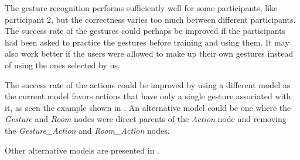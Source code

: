 The gesture recognition performs sufficiently well for some participants, like participant 2, but the correctness varies too much between different participants.
The success rate of the gestures could perhaps be improved if the participants had been asked to practice the gestures before training and using them.
It may also work better if the users were allowed to make up their own gestures instead of using the ones selected by us.

The success rate of the actions could be improved by using a different model as the current model favors actions that have only a single gesture associated with it, as seen the example shown in .
An alternative model could be one where the \emph{Gesture} and \emph{Room} nodes were direct parents of the \emph{Action} node and removing the \emph{Gesture\_Action} and \emph{Room\_Action} nodes.

Other alternative models are presented in .

